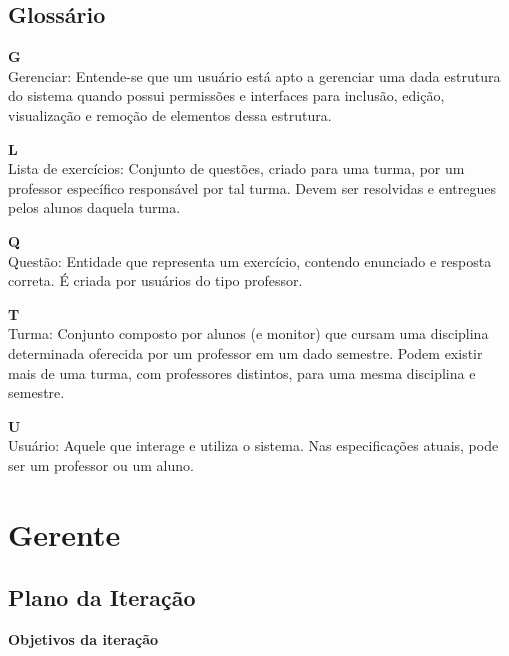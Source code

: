 \documentclass[12pt,letterpaper]{article}
\begin{document}


\pagebreak

\subsection{Glossário}

  {\bf G}\\
    Gerenciar: Entende-se que um usuário está apto a gerenciar uma dada
  estrutura do sistema quando possui permissões e interfaces para inclusão,
  edição, visualização e remoção de elementos dessa estrutura. 
  
  {\bf L}\\
	Lista de exercícios: Conjunto de questões, criado para uma turma, por um professor específico responsável por tal turma. Devem ser resolvidas e entregues pelos alunos daquela turma.
 
  {\bf Q}\\
	Questão: Entidade que representa um exercício, contendo enunciado e resposta correta. É criada por usuários do tipo professor.
	
  {\bf T}\\
    Turma: Conjunto composto por alunos (e monitor) que cursam uma disciplina 
    determinada oferecida por um professor em um dado semestre. Podem
    existir mais de uma turma, com professores distintos, para uma mesma 
    disciplina e semestre.  
    
  {\bf U}\\
    Usuário: Aquele que interage e utiliza o sistema. Nas especificações
    atuais, pode ser um professor ou um aluno.

\pagebreak



\section{Gerente}

\subsection{Plano da Iteração}

\vspace{1cm}
{\large {\bf Objetivos da iteração}}
\vspace{0.5cm}
\end{document}
